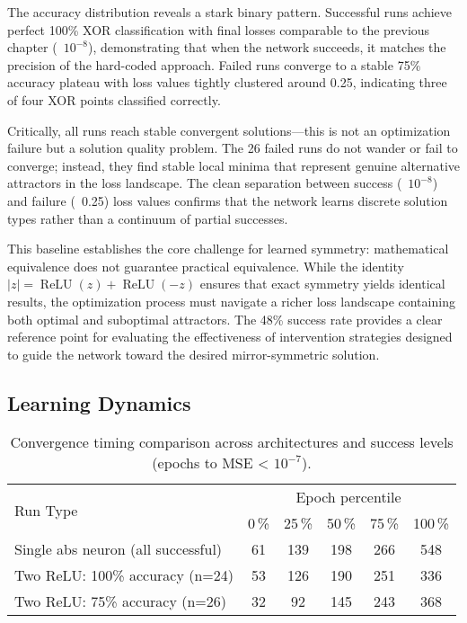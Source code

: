 The accuracy distribution reveals a stark binary pattern. Successful runs achieve perfect 100\% XOR classification with final losses comparable to the previous chapter (~$10^{-8}$), demonstrating that when the network succeeds, it matches the precision of the hard-coded approach. Failed runs converge to a stable 75\% accuracy plateau with loss values tightly clustered around 0.25, indicating three of four XOR points classified correctly.

Critically, all runs reach stable convergent solutions—this is not an optimization failure but a solution quality problem. The 26 failed runs do not wander or fail to converge; instead, they find stable local minima that represent genuine alternative attractors in the loss landscape. The clean separation between success (~$10^{-8}$) and failure (~0.25) loss values confirms that the network learns discrete solution types rather than a continuum of partial successes.

This baseline establishes the core challenge for learned symmetry: mathematical equivalence does not guarantee practical equivalence. While the identity $|z| = \operatorname{ReLU}(z) + \operatorname{ReLU}(-z)$ ensures that exact symmetry yields identical results, the optimization process must navigate a richer loss landscape containing both optimal and suboptimal attractors. The 48\% success rate provides a clear reference point for evaluating the effectiveness of intervention strategies designed to guide the network toward the desired mirror-symmetric solution.


\subsection*{Learning Dynamics}

\begin{table}[ht]
\centering
\caption{Convergence timing comparison across architectures and success levels (epochs to MSE < $10^{-7}$).}
\label{tab:relu1-baseline-timing}
\begin{tabular}{lccccc}
\toprule
\multirow{2}{*}{Run Type} &
\multicolumn{5}{c}{Epoch percentile} \\
\cmidrule(lr){2-6}
 & 0\,\% & 25\,\% & 50\,\% & 75\,\% & 100\,\% \\
\midrule
Single abs neuron (all successful) & 61 & 139 & 198 & 266 & 548 \\
Two ReLU: 100\% accuracy (n=24) & 53 & 126 & 190 & 251 & 336 \\
Two ReLU: 75\% accuracy (n=26) & 32 & 92 & 145 & 243 & 368 \\
\bottomrule
\end{tabular}
\end{table}

